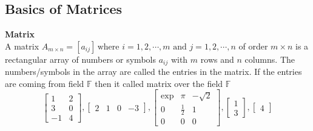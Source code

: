 \documentclass[12pt]{report}
\def\F{{\mathbb F}}
\begin{document}
\subsection{Basics of Matrices}
\begin{defn}
\textbf{Matrix}\\
A matrix $A_{m\times n}=[a_{ij}]\, \text{where } i=1,2,\cdots,m \text{ and }  j=1,2,\cdots,n$ of order $m\times n$ is a rectangular array of numbers or symbols $a_{ij}$ with $m$ rows and $n$ columns. The numbers/symbols in the array are called the entries in the matrix. If the entries are coming from field $\F$ then it called matrix over the field $\F$
\[
\begin{bmatrix}
1 &2\\
3 & 0\\
-1&4
\end{bmatrix}
,
\begin{bmatrix}
2 & 1& 0 & -3
\end{bmatrix}
,
\begin{bmatrix}
\exp &\pi&-\sqrt{2}\\
0 & \frac{1}{2}&1\\
0&0& 0
\end{bmatrix}
,
\begin{bmatrix}
1\\
3 
\end{bmatrix}
,
\begin{bmatrix}
4
\end{bmatrix}
\]
\end{defn}
\end{document}
